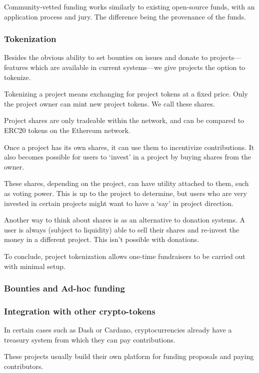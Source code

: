 Community-vetted funding works similarly to existing open-source funds, with an
application process and jury. The difference being the provenance of the funds.

\subsubsection{Tokenization}

Besides the obvious ability to set bounties on issues and donate to
projects—features which are available in current systems—we give projects the
option to tokenize.

Tokenizing a project means exchanging \oscoin{} for project tokens at a fixed
price. Only the project owner can mint new project tokens. We call these
shares.

Project shares are only tradeable within the \oscoin{} network, and can be
compared to ERC20 tokens on the Ethereum network.

Once a project has its own shares, it can use them to incentivize
contributions. It also becomes possible for users to ‘invest’ in a project by
buying shares from the owner.

These shares, depending on the project, can have utility attached to them, such
as voting power. This is up to the project to determine, but users who are very
invested in certain projects might want to have a ‘say’ in project direction.

Another way to think about shares is as an alternative to donation systems. A
user is always (subject to liquidity) able to sell their shares and re-invest
the money in a different project. This isn’t possible with donations.

To conclude, project tokenization allows one-time fundraisers to be carried out
with minimal setup.

\subsubsection{Bounties and Ad-hoc funding}

\subsubsection{Integration with other crypto-tokens}

In certain cases such as Dash or Cardano, cryptocurrencies already have a
treasury system from which they can pay contributions.

These projects usually build their own platform for funding proposals and
paying contributors.

